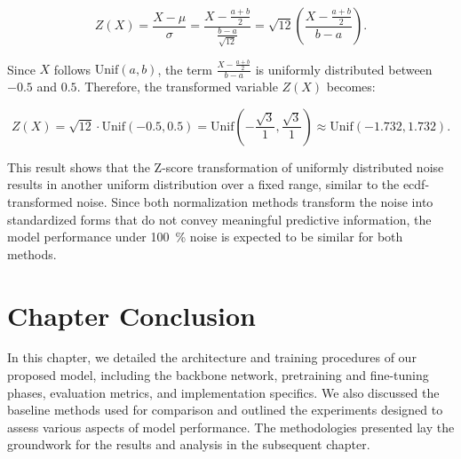 \[
    Z(X) = \frac{X - \mu}{\sigma} = \frac{X - \frac{a + b}{2}}{\frac{b - a}{\sqrt{12}}} = \sqrt{12} \left( \frac{X - \frac{a + b}{2}}{b - a} \right).
\]

Since \( X \) follows \( \text{Unif}(a, b) \), the term \( \frac{X - \frac{a + b}{2}}{b - a} \) is uniformly distributed between \(-0.5\) and \(0.5\). Therefore, the transformed variable \( Z(X) \) becomes:

\begin{equation}
    \label{eq:uniform_z_range}
    Z(X) = \sqrt{12} \cdot \text{Unif}(-0.5, 0.5) = \text{Unif}\left( -\frac{\sqrt{3}}{1}, \frac{\sqrt{3}}{1} \right) \approx \text{Unif}(-1.732, 1.732).
\end{equation}

This result shows that the Z-score transformation of uniformly distributed noise results in another uniform distribution over a fixed range, similar to the \gls{ecdf}-transformed noise. Since both normalization methods transform the noise into standardized forms that do not convey meaningful predictive information, the model performance under \qty{100}{\percent} noise is expected to be similar for both methods.



\section{Chapter Conclusion}

In this chapter, we detailed the architecture and training procedures of our proposed model, including the backbone network, pretraining and fine-tuning phases, evaluation metrics, and implementation specifics. We also discussed the baseline methods used for comparison and outlined the experiments designed to assess various aspects of model performance. The methodologies presented lay the groundwork for the results and analysis in the subsequent chapter.

